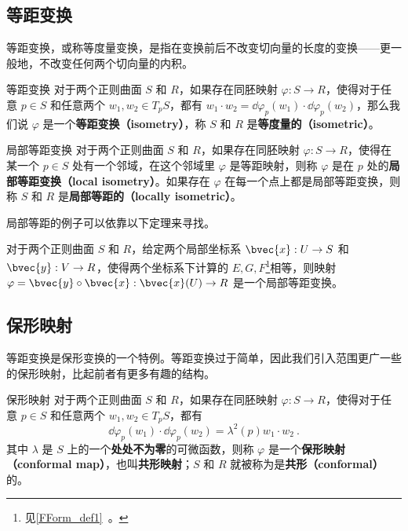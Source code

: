 
\subsection{等距变换}
等距变换，或称等度量变换，是指在变换前后不改变切向量的长度的变换——更一般地，不改变任何两个切向量的内积。

\begin{definition}{等距变换}
对于两个正则曲面 $S$ 和 $R$，如果存在同胚映射 $\varphi:S\to R$，使得对于任意 $p\in S$ 和任意两个 $w_1, w_2\in T_pS$，都有 $w_1\cdot w_2=\dd\varphi_p(w_1)\cdot\dd\varphi_p(w_2)$，那么我们说 $\varphi$ 是一个\textbf{等距变换（isometry）}，称 $S$ 和 $R$ 是\textbf{等度量的（isometric）}。
\end{definition}

\begin{definition}{局部等距变换}
对于两个正则曲面 $S$ 和 $R$，如果存在同胚映射 $\varphi:S\to R$，使得在某一个 $p\in S$ 处有一个邻域，在这个邻域里 $\varphi$ 是等距映射，则称 $\varphi$ 是在 $p$ 处的\textbf{局部等距变换（local isometry）}。如果存在 $\varphi$ 在每一个点上都是局部等距变换，则称 $S$ 和 $R$ 是\textbf{局部等距的（locally isometric）}。
\end{definition}

局部等距的例子可以依靠以下定理来寻找。

\begin{theorem}{}
对于两个正则曲面 $S$ 和 $R$，给定两个局部坐标系 $\bvec{x}:U\to S$ 和 $\bvec{y}:V\to R$，使得两个坐标系下计算的 $E, G, F$\footnote{见\autoref{FForm_def1}~。}相等，则映射 $\varphi=\bvec{y}\circ\bvec{x}:\bvec{x}(U)\to R$ 是一个局部等距变换。
\end{theorem}

\subsection{保形映射}

等距变换是保形变换的一个特例。等距变换过于简单，因此我们引入范围更广一些的保形映射，比起前者有更多有趣的结构。

\begin{definition}{保形映射}
对于两个正则曲面 $S$ 和 $R$，如果存在同胚映射 $\varphi:S\to R$，使得对于任意 $p\in S$ 和任意两个 $w_1, w_2\in T_pS$，都有\begin{equation}
\dd\varphi_p(w_1)\cdot\dd\varphi_p(w_2)=\lambda^2(p)w_1\cdot w_2~.
\end{equation}
其中 $\lambda$ 是 $S$ 上的一个\textbf{处处不为零}的可微函数，则称 $\varphi$ 是一个\textbf{保形映射（conformal map）}，也叫\textbf{共形映射}；$S$ 和 $R$ 就被称为是\textbf{共形（conformal）}的。
\end{definition}

